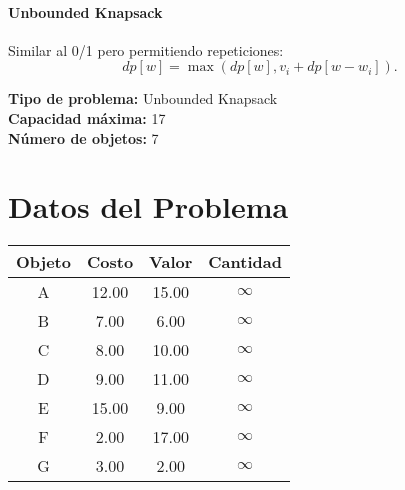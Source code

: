 \documentclass{article}
\begin{document}
\paragraph{Unbounded Knapsack} Similar al 0/1 pero permitiendo repeticiones:
\[
dp[w] = \max ( dp[w], v_i + dp[w - w_i] ).
\]

\thispagestyle{empty}
\newpage
\textbf{Tipo de problema:} Unbounded Knapsack\\
\textbf{Capacidad máxima:} 17\\
\textbf{Número de objetos:} 7\\

\section*{Datos del Problema}
\begin{tabular}{|c|c|c|c|}
\hline
Objeto & Costo & Valor & Cantidad \\
\hline
A & 12.00 & 15.00 & $\infty$ \\
B & 7.00 & 6.00 & $\infty$ \\
C & 8.00 & 10.00 & $\infty$ \\
D & 9.00 & 11.00 & $\infty$ \\
E & 15.00 & 9.00 & $\infty$ \\
F & 2.00 & 17.00 & $\infty$ \\
G & 3.00 & 2.00 & $\infty$ \\
\hline
\end{tabular}
\end{document}
